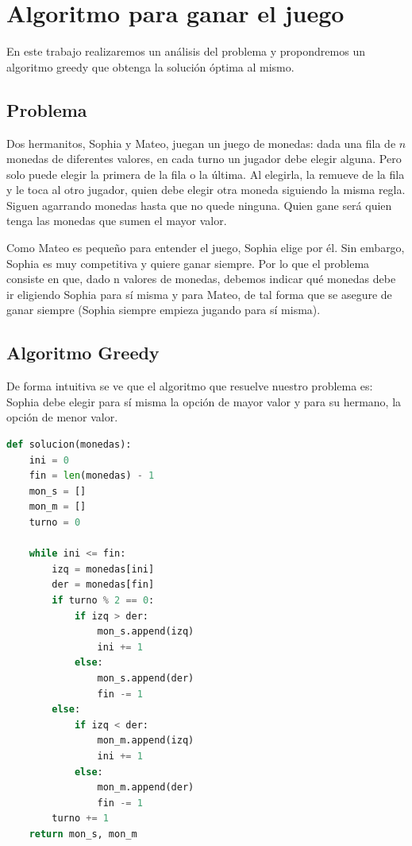 \section{Algoritmo para ganar el juego}

En este trabajo realizaremos un análisis del problema y propondremos un algoritmo greedy que obtenga la solución óptima al mismo.

\subsection{Problema}

Dos hermanitos, Sophia y Mateo, juegan un juego de monedas: dada una fila de $n$ monedas de diferentes valores, en cada turno un jugador debe elegir alguna. Pero solo puede elegir la primera de la fila o la última. Al elegirla, la remueve de la fila y le toca al otro jugador, quien debe elegir otra moneda siguiendo la misma regla. Siguen agarrando monedas hasta que no quede ninguna. Quien gane será quien tenga las monedas que sumen el mayor valor.

Como Mateo es pequeño para entender el juego, Sophia elige por él. Sin embargo, Sophia es muy competitiva y quiere ganar siempre. Por lo que el problema consiste en que, dado n valores de monedas, debemos indicar qué monedas debe ir eligiendo Sophia para sí misma y para Mateo, de tal forma que se asegure de ganar siempre (Sophia siempre empieza jugando para sí misma).

\subsection{Algoritmo Greedy}

De forma intuitiva se ve que el algoritmo que resuelve nuestro problema es: Sophia debe elegir para sí misma la opción de mayor valor y para su hermano, la opción de menor valor.

\begin{lstlisting}[language=Python]
def solucion(monedas):
    ini = 0
    fin = len(monedas) - 1
    mon_s = []
    mon_m = []
    turno = 0

    while ini <= fin:
        izq = monedas[ini]
        der = monedas[fin]
        if turno % 2 == 0:
            if izq > der:
                mon_s.append(izq)
                ini += 1
            else:
                mon_s.append(der)
                fin -= 1
        else:
            if izq < der:
                mon_m.append(izq)
                ini += 1
            else:
                mon_m.append(der)
                fin -= 1
        turno += 1
    return mon_s, mon_m
\end{lstlisting}

